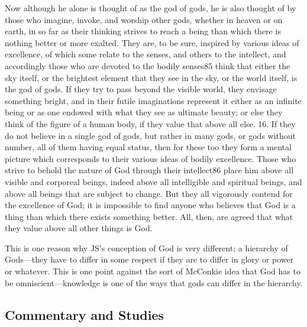 		\begin{compactdesc}
			\item[DDC I:15--16] Now although he alone is thought of as the god of gods, he is also thought of by those who imagine, invoke, and worship other gods, whether in heaven or on earth, in so far as their thinking strives to reach a being than which there is nothing better or more exalted. They are, to be sure, inspired by various ideas of excellence, of which some relate to the senses, and others to the intellect, and accordingly those who are devoted to the bodily senses85 think that either the sky itself, or the brightest element that they see in the sky, or the world itself, is the god of gods. If they try to pass beyond the visible world, they envisage something bright, and in their futile imaginations represent it either as an infinite being or as one endowed with what they see as ultimate beauty; or else they think of the figure of a human body, if they value that above all else. 16. If they do not believe in a single god of gods, but rather in many gods, or gods without number, all of them having equal status, then for these too they form a mental picture which corresponds to their various ideas of bodily excellence. Those who strive to behold the nature of God through their intellect86 place him above all visible and corporeal beings, indeed above all intelligible and spiritual beings, and above all beings that are subject to change. But they all vigorously contend for the excellence of God; it is impossible to find anyone who believes that God is a thing than which there exists something better. All, then, are agreed that what they value above all other things is God.
				\begin{compactitem}
					\item This is one reason why JS's conception of God is very different; a hierarchy of Gods---they have to differ in some respect if they are to differ in glory or power or whatever. This is one point against the sort of McConkie idea that God has to be omniscient---knowledge is one of the ways that gods can differ in the hierarchy.
				\end{compactitem}
		\end{compactdesc}
	
\subsection{Commentary and Studies} %
	\label{GODSNATURE-COMMENTARY}

